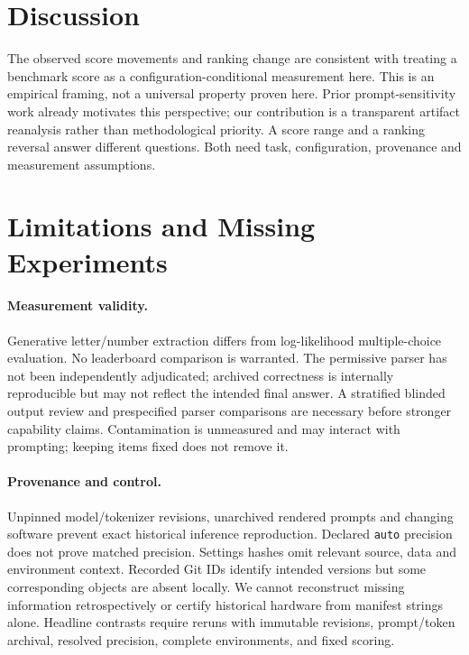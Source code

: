 \section{Discussion}
The observed score movements and ranking change are consistent with treating a benchmark score as a configuration-conditional measurement here. This is an empirical framing, not a universal property proven here. Prior prompt-sensitivity work already motivates this perspective; our contribution is a transparent artifact reanalysis rather than methodological priority. A score range and a ranking reversal answer different questions. Both need task, configuration, provenance and measurement assumptions.

\section{Limitations and Missing Experiments}
\label{sec:limitations}
\paragraph{Measurement validity.}
Generative letter/number extraction differs from log-likelihood multiple-choice evaluation. No leaderboard comparison is warranted. The permissive parser has not been independently adjudicated; archived correctness is internally reproducible but may not reflect the intended final answer. A stratified blinded output review and prespecified parser comparisons are necessary before stronger capability claims. Contamination is unmeasured and may interact with prompting; keeping items fixed does not remove it.

\paragraph{Provenance and control.}
Unpinned model/tokenizer revisions, unarchived rendered prompts and changing software prevent exact historical inference reproduction. Declared \texttt{auto} precision does not prove matched precision. Settings hashes omit relevant source, data and environment context. Recorded Git IDs identify intended versions but some corresponding objects are absent locally. We cannot reconstruct missing information retrospectively or certify historical hardware from manifest strings alone. Headline contrasts require reruns with immutable revisions, prompt/token archival, resolved precision, complete environments, and fixed scoring.

